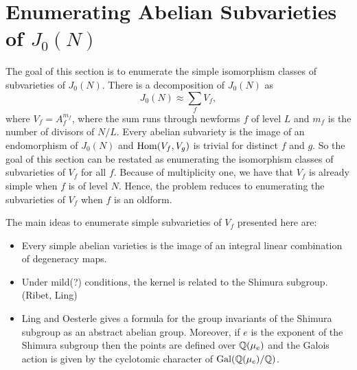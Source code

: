 \documentclass{article}
\begin{document}
\section{Enumerating Abelian Subvarieties of $J_0(N)$}

The goal of this section is to enumerate the simple isomorphism classes of
subvarieties of $J_0(N)$. There is a decomposition of $J_0(N)$ as 
\[
    J_0(N) \approx 
    \sum_{f} V_f,
\]
where $V_f=A_f ^{m_f}$, where the sum runs through newforms $f$ of level $L$
and $m_f$ is the number of divisors of $N/L$. Every abelian subvariety is the
image of an endomorphism of $J_0(N)$ and $\operatorname{Hom}(V_f, V_g)$ is trivial for
distinct $f$ and $g$. So the goal of this section can be restated as
enumerating the isomorphism classes of subvarieties of $V_f$ for all $f$.
Because of multiplicity one, we have that $V_f$ is already simple when $f$ is
of level $N$. Hence, the problem reduces to enumerating the subvarieties of
$V_f$ when $f$ is an oldform.

The main ideas to enumerate simple subvarieties of $V_f$ presented here are:
\begin{itemize}
    \item 
        Every simple abelian varieties is the image of an integral linear
        combination of degeneracy maps.  
    \item
        Under mild(?) conditions, the kernel is related to the Shimura
        subgroup. (Ribet, Ling)
    \item
        Ling and Oesterle gives a formula for the group invariants of the
        Shimura subgroup as an abstract abelian group. Moreover, if $e$ is the
        exponent of the Shimura subgroup then the points are defined over
        $\mathbb{Q}(\mu_e)$ and the Galois action is given by the cyclotomic character
        of $\operatorname{Gal}(\mathbb{Q}(\mu_e)/\mathbb{Q})$.
\end{itemize}
\end{document}
